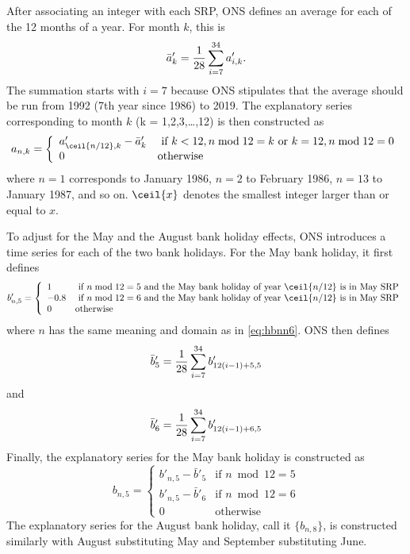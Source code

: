 \documentclass[a4paper,11pt,pdftex,twoside,titlepage]{article}
\begin{document}
After associating an integer with each SRP, ONS defines an average for
each of the 12 months of a year. For month $k$, this is
\[
  \bar a'_{k} = {1 \over 28} \sum_{i=7}^{34} a'_{i, k}.
\]
The summation starts with $i=7$ because ONS stipulates that the
average should be run from 1992 (7th year since 1986) to 2019. The
explanatory series corresponding to month $k$ (k = 1,2,3,\dots,12) is
then constructed as
\begin{equation}
  \label{eq:hbnn6}
  a_{n, k} = \left\{
    \begin{array}{ll}
      a'_{\ceil{n/12}, k} - \bar a'_{k} & \text{ if } k < 12, n \bmod{12} = k
      \text{ or } k = 12, n \bmod{12} = 0\\
      0 & \text{otherwise}
    \end{array}
  \right.
\end{equation}
where $n=1$ corresponds to January 1986, $n=2$ to February 1986,
$n=13$ to January 1987, and so on. $\ceil{x}$ denotes the smallest
integer larger than or equal to $x$.

To adjust for the May and the August bank holiday effects, ONS
introduces a time series for each of the two bank holidays. For the
May bank holiday, it first defines
\[
  b'_{n, 5} = \left\{
    \begin{array}{ll}
      1 & \text{ if } n \bmod{12} = 5 \text{ and the May bank holiday
          of year } \ceil{n/12} \text{ is in May SRP} \\
      -0.8 & \text{ if } n \bmod{12} = 6 \text{ and the May bank
             holiday of year } \ceil{n/12} \text{ is in May SRP}\\
      0 & \text{otherwise}
    \end{array}
    \right.
\]
where $n$ has the same meaning and domain as in \eqref{eq:hbnn6}. ONS
then defines
\[
  \bar b'_{5} = {1 \over 28}\sum_{i=7}^{34} b'_{12(i-1) + 5, 5}
\]
and
\[
  \bar b'_{6} = {1 \over 28}\sum_{i=7}^{34} b'_{12(i-1) + 6, 5}
\]
Finally, the explanatory series for the May bank holiday is
constructed as
\[
  b_{n, 5} = \left\{
      \begin{array}{ll}
        b'_{n,5} - \bar b'_5 & \text{if } n \bmod{12} = 5 \\
        b'_{n,5} - \bar b'_6 & \text{if } n \bmod{12} = 6 \\
        0 & \text{otherwise}
      \end{array}
    \right.
\]
The explanatory series for the August bank holiday, call it
$\{b_{n,8}\}$, is constructed similarly with August substituting May
and September substituting June.
\end{document}
